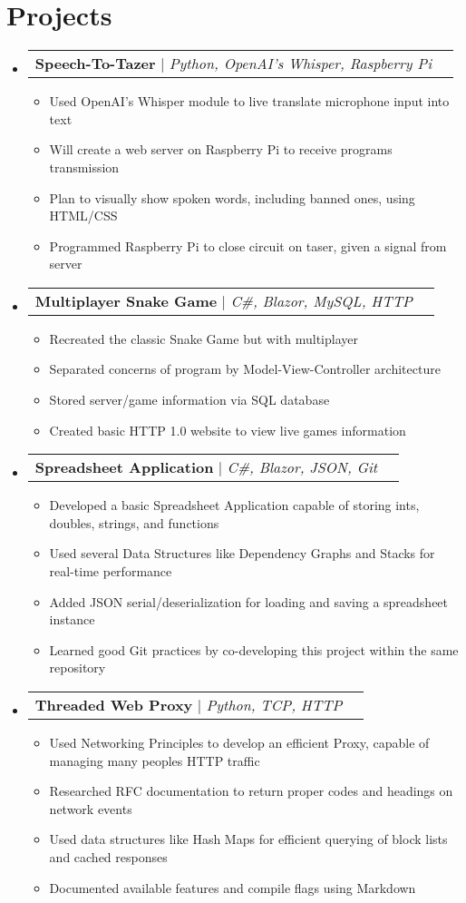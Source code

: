 \documentclass[letterpaper,11pt]{article}
\makeatletter
\newcommand{\resumeItem}[1]{
  \item\small{
    {#1 \vspace{-2pt}}
  }
}
\newcommand{\resumeProjectHeading}[2]{
    \item
    \begin{tabular*}{0.97\textwidth}{l@{\extracolsep{\fill}}r}
      \small#1 & #2 \\
    \end{tabular*}\vspace{-7pt}
}
\newcommand{\resumeSubHeadingListStart}{\begin{itemize}[leftmargin=0.15in, label={}]}
\newcommand{\resumeSubHeadingListEnd}{\end{itemize}}
\newcommand{\resumeItemListStart}{\begin{itemize}}
\newcommand{\resumeItemListEnd}{\end{itemize}\vspace{-5pt}}
\makeatother
\begin{document}
\section{Projects}
    \resumeSubHeadingListStart
      \resumeProjectHeading
          {\textbf{Speech-To-Tazer} $|$ \emph{Python, OpenAI's Whisper, Raspberry Pi}}{}
          \resumeItemListStart
            \resumeItem{Used OpenAI's Whisper module to live translate microphone input into text}
            \resumeItem{Will create a web server on Raspberry Pi to receive programs transmission}
            \resumeItem{Plan to visually show spoken words, including banned ones, using HTML/CSS}
            \resumeItem{Programmed Raspberry Pi to close circuit on taser, given a signal from server}
          \resumeItemListEnd
      \resumeProjectHeading
          {\textbf{Multiplayer Snake Game} $|$ \emph{C\#, Blazor, MySQL, HTTP}}{}
          \resumeItemListStart
            \resumeItem{Recreated the classic Snake Game but with multiplayer}
            \resumeItem{Separated concerns of program by Model-View-Controller architecture}
            \resumeItem{Stored server/game information via SQL database }
            \resumeItem{Created basic HTTP 1.0 website to view live games information}
          \resumeItemListEnd
          \resumeProjectHeading
          {\textbf{Spreadsheet Application} $|$ \emph{C\#, Blazor, JSON, Git}}{}
          \resumeItemListStart
            \resumeItem{Developed a basic Spreadsheet Application capable of storing ints, doubles, strings, and functions}
            \resumeItem{Used several Data Structures like Dependency Graphs and Stacks for real-time performance}
            \resumeItem{Added JSON serial/deserialization for loading and saving a spreadsheet instance}
            \resumeItem{Learned good Git practices by co-developing this project within the same repository}
          \resumeItemListEnd
        \resumeProjectHeading
          {\textbf{Threaded Web Proxy} $|$ \emph{Python, TCP, HTTP}}{}
          \resumeItemListStart
            \resumeItem{Used Networking Principles to develop an efficient Proxy, capable of managing many peoples HTTP traffic}
            \resumeItem{Researched RFC documentation to return proper codes and headings on network events}
            \resumeItem{Used data structures like Hash Maps for efficient querying of block lists and cached responses }
            \resumeItem{Documented available features and compile flags using Markdown }
          \resumeItemListEnd
    \resumeSubHeadingListEnd
    
\end{document}
